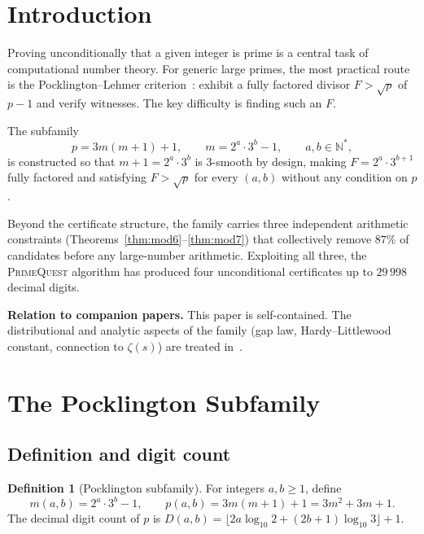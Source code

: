 \documentclass[11pt,a4paper]{article}
\theoremstyle{definition}
\newtheorem{definition}[theorem]{Definition}
\theoremstyle{remark}
\newcommand{\N}{\mathbb{N}}
\begin{document}
\tableofcontents

\section{Introduction}\label{sec:intro}

Proving unconditionally that a given integer is prime is a central task of
computational number theory. For generic large primes, the most practical
route is the Pocklington--Lehmer criterion~\cite{Pocklington1914,
LehmerPSW1975}: exhibit a fully factored divisor $F>{\sqrt{p}}$ of $p-1$
and verify witnesses. The key difficulty is finding such an $F$.

The subfamily
\[
  p = 3m(m+1)+1,\qquad m = 2^a\cdot 3^b-1,\qquad a,b\in\N^*,
\]
is constructed so that $m+1=2^a\cdot 3^b$ is $3$-smooth by design,
making $F=2^a\cdot 3^{b+1}$ fully factored and satisfying $F>\sqrt{p}$
for every $(a,b)$ without any condition on $p$.

Beyond the certificate structure, the family carries three independent
arithmetic constraints (Theorems~\ref{thm:mod6}--\ref{thm:mod7}) that
collectively remove $87\%$ of candidates before any large-number arithmetic.
Exploiting all three, the \textsc{PrimeQuest} algorithm has produced four
unconditional certificates up to $29\,998$ decimal digits.

\smallskip
\noindent\textbf{Relation to companion papers.}
This paper is self-contained. The distributional and analytic aspects of
the family (gap law, Hardy--Littlewood constant, connection to $\zeta(s)$)
are treated in~\cite{PaperI,PaperII}.

\section{The Pocklington Subfamily}\label{sec:family}

\subsection{Definition and digit count}

\begin{definition}[Pocklington subfamily]\label{def:pocklington}
For integers $a,b\geq 1$, define
\[
  m(a,b) = 2^a\cdot 3^b - 1, \qquad
  p(a,b) = 3m(m+1)+1 = 3m^2+3m+1.
\]
The decimal digit count of $p$ is
$D(a,b) = \lfloor 2a\log_{10}2 + (2b+1)\log_{10}3\rfloor + 1.$
\end{definition}
\end{document}
